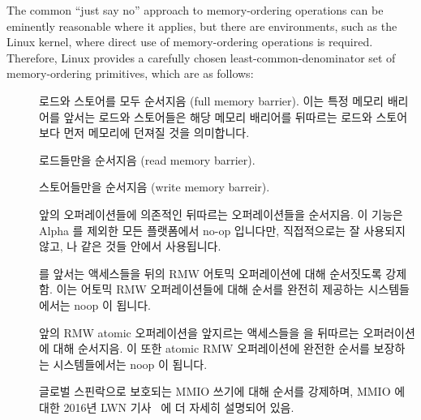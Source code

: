 The common ``just say no'' approach to memory-ordering operations
can be eminently reasonable where it applies,
but there are environments, such as the Linux kernel, where direct
use of memory-ordering operations is required.
Therefore,
Linux provides a carefully chosen least-common-denominator
set of memory-ordering primitives, which are as follows:
\fi
\begin{description}
\item	[] 로드와 스토어를 모두 순서지음 (full memory barrier).
	이는 특정 메모리 배리어를 앞서는 로드와 스토어들은 해당 메모리 배리어를
	뒤따르는 로드와 스토어보다 먼저 메모리에 던져질 것을 의미합니다.
\item	[] 로드들만을 순서지음 (read memory barrier).
\item	[] 스토어들만을 순서지음 (write memory barreir).
\item	[] 앞의 오퍼레이션들에 의존적인
	뒤따르는 오퍼레이션들을 순서지음.
	이 기능은 Alpha 를 제외한 모든 플랫폼에서 no-op 입니다만, 직접적으로는
	잘 사용되지 않고,  나 
	같은 것들 안에서 사용됩니다.
\item	[]  를 앞서는
	액세스들을 뒤의 RMW 어토믹 오퍼레이션에 대해 순서짓도록 강제함.
	이는 어토믹 RMW 오퍼레이션들에 대해 순서를 완전히 제공하는
	시스템들에서는 noop 이 됩니다.
\item	[] 앞의 RMW atomic 오퍼레이션을 앞지르는
	액세스들을  을 뒤따르는 오퍼러이션에 대해
	순서지음.
	이 또한 atomic RMW 오퍼레이션에 완전한 순서를 보장하는 시스템들에서는
	noop 이 됩니다.
\item	[] 글로벌 스핀락으로 보호되는 MMIO 쓰기에 대해 순서를
	강제하며, MMIO 에 대한 2016년 LWN
	기사~\cite{PaulEMcKenney2016LinuxKernelMMIO} 에 더 자세히 설명되어
	있음.
\iffalse
	

\end{description}
